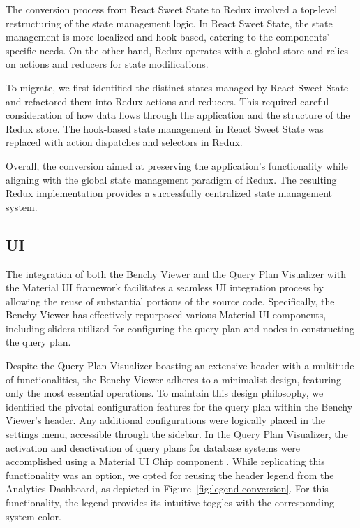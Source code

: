The conversion process from React Sweet State to Redux involved a top-level restructuring of the state management logic. In React Sweet State, the state management is more localized and hook-based, catering to the components' specific needs. On the other hand, Redux operates with a global store and relies on actions and reducers for state modifications.

To migrate, we first identified the distinct states managed by React Sweet State and refactored them into Redux actions and reducers. This required careful consideration of how data flows through the application and the structure of the Redux store. The hook-based state management in React Sweet State was replaced with action dispatches and selectors in Redux.

Overall, the conversion aimed at preserving the application's functionality while aligning with the global state management paradigm of Redux. The resulting Redux implementation provides a successfully centralized state management system.


\subsection{UI}

The integration of both the Benchy Viewer and the Query Plan Visualizer with the Material UI framework facilitates a seamless UI integration process by allowing the reuse of substantial portions of the source code. Specifically, the Benchy Viewer has effectively repurposed various Material UI components, including sliders utilized for configuring the query plan and nodes in constructing the query plan.

Despite the Query Plan Visualizer boasting an extensive header with a multitude of functionalities, the Benchy Viewer adheres to a minimalist design, featuring only the most essential operations. To maintain this design philosophy, we identified the pivotal configuration features for the query plan within the Benchy Viewer's header. Any additional configurations were logically placed in the settings menu, accessible through the sidebar. In the Query Plan Visualizer, the activation and deactivation of query plans for database systems were accomplished using a Material UI Chip component \parencite{mui-chip}. While replicating this functionality was an option, we opted for reusing the header legend from the Analytics Dashboard, as depicted in Figure~\ref{fig:legend-conversion}. For this functionality, the legend provides its intuitive toggles with the corresponding system color.

